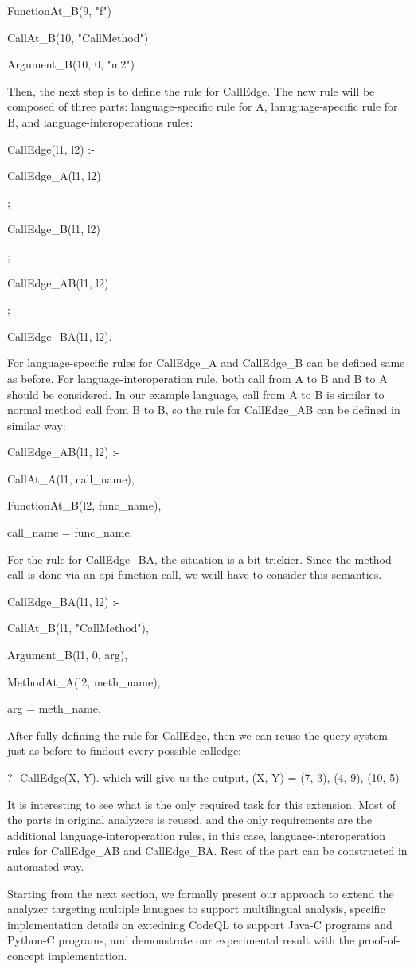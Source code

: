 FunctionAt\_B(9, "f")

CallAt\_B(10, "CallMethod")

Argument\_B(10, 0, "m2")

Then, the next step is to define the rule for CallEdge.  The new rule will be
composed of three parts: language-specific rule for A, lanuguage-specific rule
for B, and language-interoperations rules:

CallEdge(l1, l2) :-

    CallEdge\_A(l1, l2)
    
    ;
    
    CallEdge\_B(l1, l2)

    ;

    CallEdge\_AB(l1, l2)

    ;

    CallEdge\_BA(l1, l2).

For language-specific rules for CallEdge\_A and CallEdge\_B can be defined same
as before.  For language-interoperation rule, both call from A to B and B to A
should be considered. In our example language, call from A to B is similar to
normal method call from B to B, so the rule for CallEdge\_AB can be defined in
similar way:

CallEdge\_AB(l1, l2) :-

    CallAt\_A(l1, call\_name),
    
    FunctionAt\_B(l2, func\_name),
    
    call\_name = func\_name.

For the rule for CallEdge\_BA, the situation is a bit trickier.  Since the
method call is done via an api function call, we weill have to consider this
semantics.

CallEdge\_BA(l1, l2) :-

    CallAt\_B(l1, "CallMethod"),
    
    Argument\_B(l1, 0, arg),
    
    MethodAt\_A(l2, meth\_name),
    
    arg = meth\_name.

After fully defining the rule for CallEdge, then we can reuse the query system
just as before to findout every possible calledge:

?- CallEdge(X, Y).
which will give us the output, (X, Y) = (7, 3), (4, 9), (10, 5)

It is interesting to see what is the only required task for this extension.
Most of the parts in original analyzers is reused, and the only requirements
are the additional language-interoperation rules, in this case,
language-interoperation rules for CallEdge\_AB and CallEdge\_BA. Rest of the
part can be constructed in automated way.

Starting from the next section, we formally present our approach to extend the
analyzer targeting multiple lanugaes to support multilingual analysis, specific
implementation details on extedning CodeQL to support Java-C programs and
Python-C programs, and demonstrate our experimental result with the
proof-of-concept implementation.
